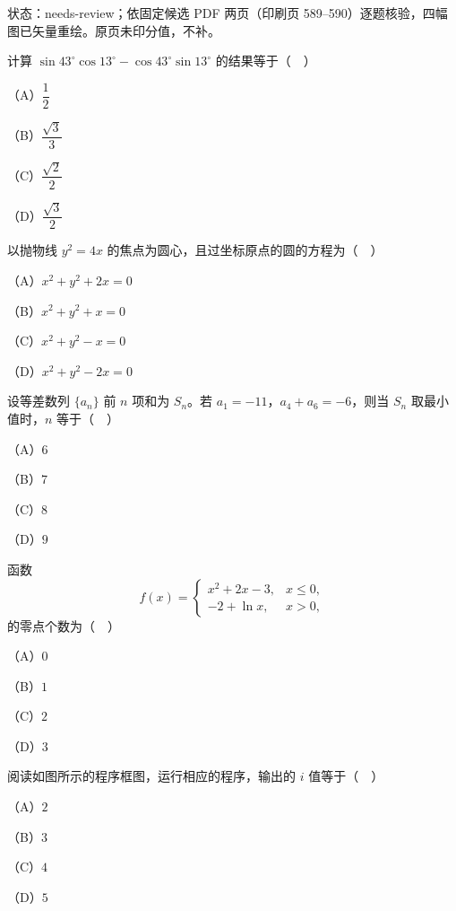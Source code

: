 状态：needs-review；依固定候选 PDF 两页（印刷页 589–590）逐题核验，四幅图已矢量重绘。原页未印分值，不补。
\begin{question}
计算 $\sin43^\circ\cos13^\circ-\cos43^\circ\sin13^\circ$ 的结果等于（　）

（A）$\dfrac12$

（B）$\dfrac{\sqrt3}{3}$

（C）$\dfrac{\sqrt2}{2}$

（D）$\dfrac{\sqrt3}{2}$

\end{question}
\begin{question}
以抛物线 $y^2=4x$ 的焦点为圆心，且过坐标原点的圆的方程为（　）

（A）$x^2+y^2+2x=0$

（B）$x^2+y^2+x=0$

（C）$x^2+y^2-x=0$

（D）$x^2+y^2-2x=0$

\end{question}
\begin{question}
设等差数列 $\{a_n\}$ 前 $n$ 项和为 $S_n$。若 $a_1=-11$，$a_4+a_6=-6$，则当 $S_n$ 取最小值时，$n$ 等于（　）

（A）$6$

（B）$7$

（C）$8$

（D）$9$

\end{question}
\begin{question}
函数
\nopagebreak[4]
\[f(x)=\begin{cases}x^2+2x-3,&x\leqslant0,\\-2+\ln x,&x>0,\end{cases}\]
的零点个数为（　）

（A）$0$

（B）$1$

（C）$2$

（D）$3$

\Needspace{0.4\textheight}
\end{question}
\begingroup
\renewenvironment{question}{\Needspace{0.5\textheight}}{}
\begin{question}
阅读如图所示的程序框图，运行相应的程序，输出的 $i$ 值等于（　）

（A）$2$

（B）$3$

（C）$4$

（D）$5$
\nopagebreak[4]
\begin{center}\end{center}
\nopagebreak[4]
\Needspace{0.4\textheight}
\end{question}
